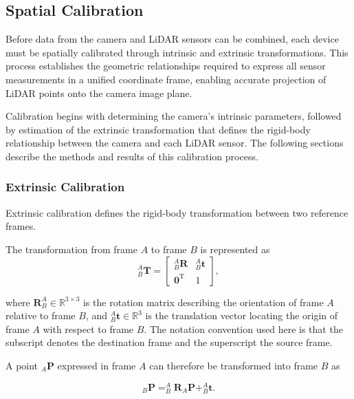 \documentclass{erauthesis}
\begin{document}
\subsection{Spatial Calibration} \label{spatial_calibration}

Before data from the camera and \ac{LiDAR} sensors can be combined, each device must be spatially calibrated through intrinsic and extrinsic transformations.  
This process establishes the geometric relationships required to express all sensor measurements in a unified coordinate frame, enabling accurate projection of \ac{LiDAR} points onto the camera image plane.

Calibration begins with determining the camera’s intrinsic parameters, followed by estimation of the extrinsic transformation that defines the rigid-body relationship between the camera and each \ac{LiDAR} sensor.  
The following sections describe the methods and results of this calibration process.

\subsubsection{Extrinsic Calibration} \label{extrinsic_tform}

Extrinsic calibration defines the rigid-body transformation between two reference frames.  

The transformation from frame $A$ to frame $B$ is represented as
\begin{equation}
    _{B}^{A}\mathbf{T} =
    \begin{bmatrix}
        _{B}^{A}\mathbf{R} & _{B}^{A}\mathbf{t} \\
        \mathbf{0}^\mathrm{T} & 1
    \end{bmatrix},
\end{equation}

where $\mathbf{R}_{B}^{A} \in \mathbb{R}^{3\times3}$ is the rotation matrix describing the orientation of frame $A$ relative to frame $B$, and $_{B}^{A}\mathbf{t} \in \mathbb{R}^{3}$ is the translation vector locating the origin of frame $A$ with respect to frame $B$.  
The notation convention used here is that the subscript denotes the destination frame and the superscript the source frame.

A point $_{A}\mathbf{P}$ expressed in frame $A$ can therefore be transformed into frame $B$ as

\begin{equation}
    _{B}\mathbf{P} =
    _{B}^{A}\mathbf{R} _{A}\mathbf{P} + _{B}^{A}\mathbf{t}.
\end{equation}
\end{document}
